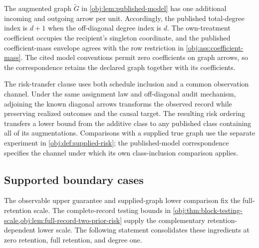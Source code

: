 
The augmented graph \(\widetilde G\) in \cref{obj:lem:published-model} has one additional incoming and outgoing arrow per unit. Accordingly, the published total-degree index is \(d+1\) when the off-diagonal degree index is \(d\). The own-treatment coefficient occupies the recipient's singleton coordinate, and the published coefficient-mass envelope agrees with the row restriction in \cref{obj:ass:coefficient-mass}. The cited model conventions permit zero coefficients on graph arrows, so the correspondence retains the declared graph together with its coefficients.

The risk-transfer clause uses both schedule inclusion and a common observation channel. Under the same assignment law and off-diagonal audit mechanism, adjoining the known diagonal arrows transforms the observed record while preserving realized outcomes and the causal target. The resulting risk ordering transfers a lower bound from the additive class to any published class containing all of its augmentations. Comparisons with a supplied true graph use the separate experiment in \cref{obj:def:supplied-risk}; the published-model correspondence specifies the channel under which its own class-inclusion comparison applies.

\subsection{Supported boundary cases}

The observable upper guarantee and supplied-graph lower comparison fix the full-retention scale. The complete-record testing bounds in \cref{obj:thm:block-testing-scale,obj:lem:full-record-two-prior-risk} supply the complementary retention-dependent lower scale. The following statement consolidates these ingredients at zero retention, full retention, and degree one.

